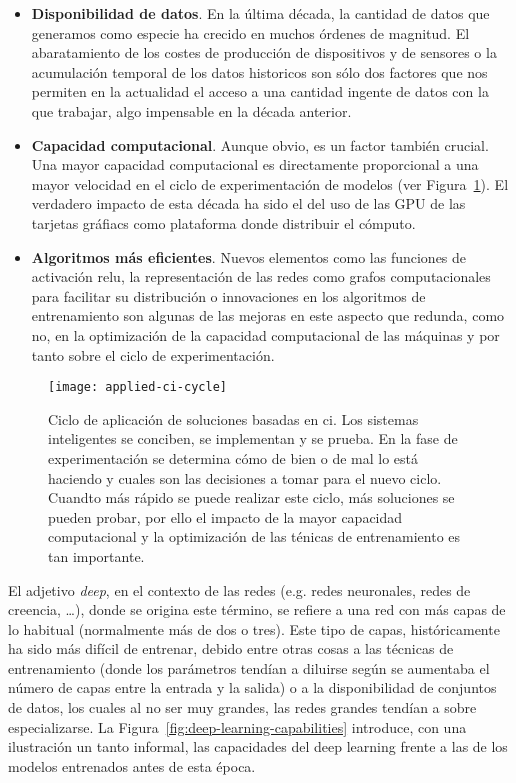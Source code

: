 \begin{itemize}
	\item \textbf{Disponibilidad de datos}. En la última década, la cantidad de datos que generamos como especie ha crecido en muchos órdenes de magnitud. El abaratamiento de los costes de producción de dispositivos y de sensores o la acumulación temporal de los datos historicos son sólo dos factores que nos permiten en la actualidad el acceso a una cantidad ingente de datos con la que trabajar, algo impensable en la década anterior.
	\item \textbf{Capacidad computacional}. Aunque obvio, es un factor también crucial. Una mayor capacidad computacional es directamente proporcional a una mayor velocidad en el ciclo de experimentación de modelos (ver Figura~\ref{fig:applied-ci-cycle}). El verdadero impacto de esta década ha sido el del uso de las GPU de las tarjetas gráfiacs como plataforma donde distribuir el cómputo.
	\item \textbf{Algoritmos más eficientes}. Nuevos elementos como las funciones de activación \gls{relu}, la representación de las redes como grafos computacionales para facilitar su distribución o innovaciones en los algoritmos de entrenamiento son algunas de las mejoras en este aspecto que redunda, como no, en la optimización de la capacidad computacional de las máquinas y por tanto sobre el ciclo de experimentación.
\end{itemize}

\begin{figure}[t]
	\centering
	\texttt{[image: applied-ci-cycle]}
	\caption[Ciclo de aplicación de soluciones basadas en \acrlong{ci}]{Ciclo de aplicación de soluciones basadas en \acrlong{ci}. Los sistemas inteligentes se conciben, se implementan y se prueba. En la fase de experimentación se determina cómo de bien o de mal lo está haciendo y cuales son las decisiones a tomar para el nuevo ciclo. Cuandto más rápido se puede realizar este ciclo, más soluciones se pueden probar, por ello el impacto de la mayor capacidad computacional y la optimización de las ténicas de entrenamiento es tan importante.}
	\label{fig:applied-ci-cycle}
\end{figure}

El adjetivo \textit{deep}, en el contexto de las redes (e.g. redes neuronales, redes de creencia, \ldots), donde se origina este término, se refiere a una red con más capas de lo habitual (normalmente más de dos o tres). Este tipo de capas, históricamente ha sido más difícil de entrenar, debido entre otras cosas a las técnicas de entrenamiento (donde los parámetros tendían a diluirse según se aumentaba el número de capas entre la entrada y la salida) o a la disponibilidad de conjuntos de datos, los cuales al no ser muy grandes, las redes grandes tendían a sobre especializarse. La Figura~\ref{fig:deep-learning-capabilities} introduce, con una ilustración un tanto informal, las capacidades del deep learning frente a las de los modelos entrenados antes de esta época.

